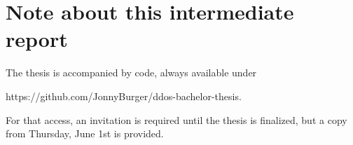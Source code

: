 \chapter{Note about this intermediate report}

The thesis is accompanied by code, always available under

https://github.com/JonnyBurger/ddos-bachelor-thesis.

For that access, an invitation is required until the thesis is finalized, but a copy from Thursday, June 1st is provided.
